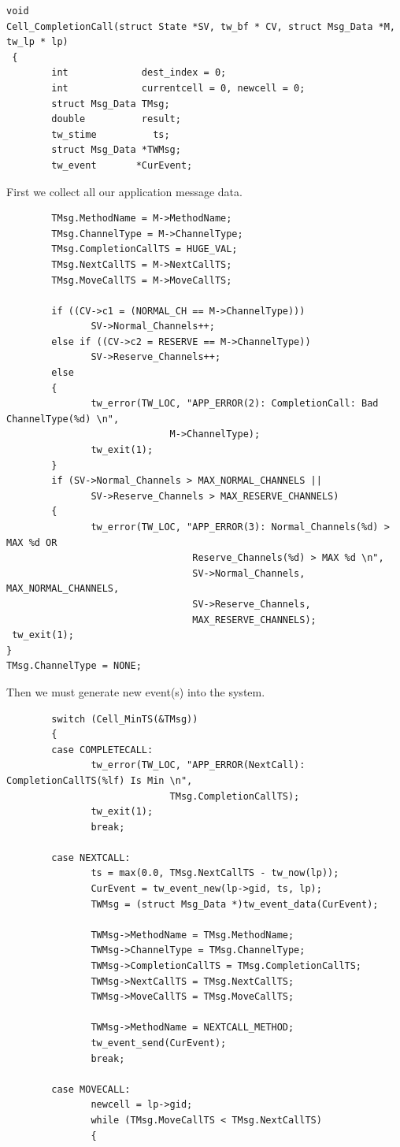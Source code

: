 \documentclass[12pt]{article}
\begin{document}
\begin{verbatim}
void
Cell_CompletionCall(struct State *SV, tw_bf * CV, struct Msg_Data *M, tw_lp * lp)
 {
        int             dest_index = 0;
        int             currentcell = 0, newcell = 0;
        struct Msg_Data TMsg;
        double          result;
        tw_stime          ts;
        struct Msg_Data *TWMsg;
        tw_event       *CurEvent;
\end{verbatim}
 
First we collect all our application message data.

\begin{verbatim}
        TMsg.MethodName = M->MethodName;
        TMsg.ChannelType = M->ChannelType;
        TMsg.CompletionCallTS = HUGE_VAL;
        TMsg.NextCallTS = M->NextCallTS;
        TMsg.MoveCallTS = M->MoveCallTS;

        if ((CV->c1 = (NORMAL_CH == M->ChannelType)))
               SV->Normal_Channels++;
        else if ((CV->c2 = RESERVE == M->ChannelType))
               SV->Reserve_Channels++;
        else
        {
               tw_error(TW_LOC, "APP_ERROR(2): CompletionCall: Bad ChannelType(%d) \n",
                             M->ChannelType);
               tw_exit(1);
        }
        if (SV->Normal_Channels > MAX_NORMAL_CHANNELS ||
               SV->Reserve_Channels > MAX_RESERVE_CHANNELS)
        {
               tw_error(TW_LOC, "APP_ERROR(3): Normal_Channels(%d) > MAX %d OR
                                 Reserve_Channels(%d) > MAX %d \n",
                                 SV->Normal_Channels, MAX_NORMAL_CHANNELS, 
                                 SV->Reserve_Channels,
                                 MAX_RESERVE_CHANNELS);
 tw_exit(1);
}
TMsg.ChannelType = NONE;
\end{verbatim} 

Then we must generate new event(s) into the system.

\begin{verbatim}
        switch (Cell_MinTS(&TMsg))
        {
        case COMPLETECALL:
               tw_error(TW_LOC, "APP_ERROR(NextCall): CompletionCallTS(%lf) Is Min \n",
                             TMsg.CompletionCallTS);
               tw_exit(1);
               break;

        case NEXTCALL:
               ts = max(0.0, TMsg.NextCallTS - tw_now(lp));
               CurEvent = tw_event_new(lp->gid, ts, lp);
               TWMsg = (struct Msg_Data *)tw_event_data(CurEvent);

               TWMsg->MethodName = TMsg.MethodName;
               TWMsg->ChannelType = TMsg.ChannelType;
               TWMsg->CompletionCallTS = TMsg.CompletionCallTS;
               TWMsg->NextCallTS = TMsg.NextCallTS;
               TWMsg->MoveCallTS = TMsg.MoveCallTS;

               TWMsg->MethodName = NEXTCALL_METHOD;
               tw_event_send(CurEvent);
               break;

        case MOVECALL:
               newcell = lp->gid;
               while (TMsg.MoveCallTS < TMsg.NextCallTS)
               {
\end{verbatim}
 
\end{document}
